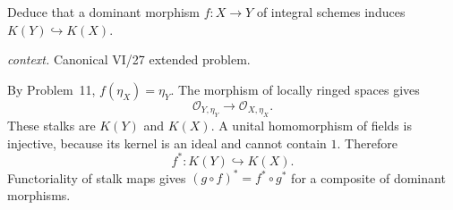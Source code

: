 \begin{problem}\label{prob:vi27-p12}
Deduce that a dominant morphism \(f:X\to Y\) of integral schemes induces \(K(Y)\hookrightarrow K(X)\).
\par\smallskip\noindent\textit{context.} Canonical VI/27 extended problem.
\end{problem}

\ifdefined\FullProblemDossiers
\begin{solution}
By Problem~11, \(f(\eta_X)=\eta_Y\). The morphism of locally ringed spaces gives
\[
\mathcal O_{Y,\eta_Y}\longrightarrow\mathcal O_{X,\eta_X}.
\]
These stalks are \(K(Y)\) and \(K(X)\). A unital homomorphism of fields is injective, because its kernel is an
ideal and cannot contain \(1\). Therefore
\[
f^*:K(Y)\hookrightarrow K(X).
\]
Functoriality of stalk maps gives \((g\circ f)^*=f^*\circ g^*\) for a composite of dominant morphisms.
\end{solution}
\fi
